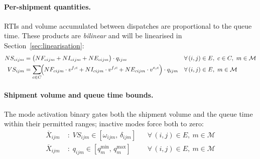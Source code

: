 
\paragraph{Per-shipment quantities.}
RTIs and volume accumulated between dispatches are proportional to
the queue time. These products are \emph{bilinear} and will be
linearised in Section~\ref{sec:linearisation}:
%
\begin{align}
  NS_{cijm}
  &= \bigl(NF_{cijm}+NI_{cijm}+NE_{cijm}\bigr)
     \cdot q_{ijm}
  && \forall\,(i,j)\in E,\ c\in C,\ m\in\mathcal{M}
  \label{eq:ship-N}\\
  VS_{ijm}
  &= \sum_{c\in C}\!\Bigl(
       NF_{cijm}\cdot v^{f,c}
      +NI_{cijm}\cdot v^{f,c}
      +NE_{cijm}\cdot v^{e,c}
     \Bigr)\cdot q_{ijm}
  && \forall\,(i,j)\in E,\ m\in\mathcal{M}
  \label{eq:ship-vol}
\end{align}


\paragraph{Shipment volume and queue time bounds.}
The mode activation binary gates both the shipment volume and the
queue time within their permitted ranges; inactive modes force
both to zero:
%
\begin{align}
  \overline{X}_{ijm}
    &\;:\; VS_{ijm} \in [\omega_{ijm},\, \delta_{ijm}]
  && \forall\,(i,j)\in E,\ m\in\mathcal{M}
  \label{eq:vol-bounds}\\[4pt]
  \overline{X}_{ijm}
    &\;:\; q_{ijm} \in [q^{\min}_{m},\, q^{\max}_{m}]
  && \forall\,(i,j)\in E,\ m\in\mathcal{M}
  \label{eq:q-bounds}
\end{align}


